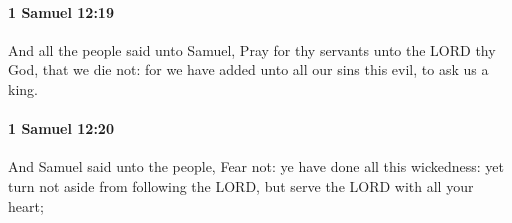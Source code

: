 		\paragraph{1 Samuel 12:19} %
			\label{1SAMUEL-12-19}

			And all the people said unto Samuel, Pray for thy servants unto the LORD thy God, that we die not: for we have added unto all our sins this evil, to ask us a king.


		\paragraph{1 Samuel 12:20} %
			\label{1SAMUEL-12-20}

			And Samuel said unto the people, Fear not: ye have done all this wickedness: yet turn not aside from following the LORD, but serve the LORD with all your heart;


